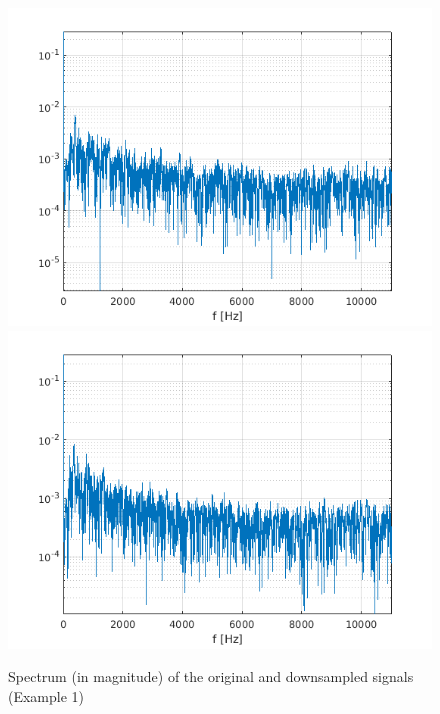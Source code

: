 \begin{figure}[!h]
{\begin{minipage}{\linewidth}
			\includegraphics[scale=0.45]{images/DownsamplingCircuit/outLFFT.png}
			\includegraphics[scale=0.45]{images/DownsamplingCircuit/outRFFT.png}
		\end{minipage}
	}%
	\caption{Spectrum (in magnitude) of the original and downsampled signals (Example 1)}%
	\label{fig:downsamplingWavEx1Spectrum}%
\end{figure}


